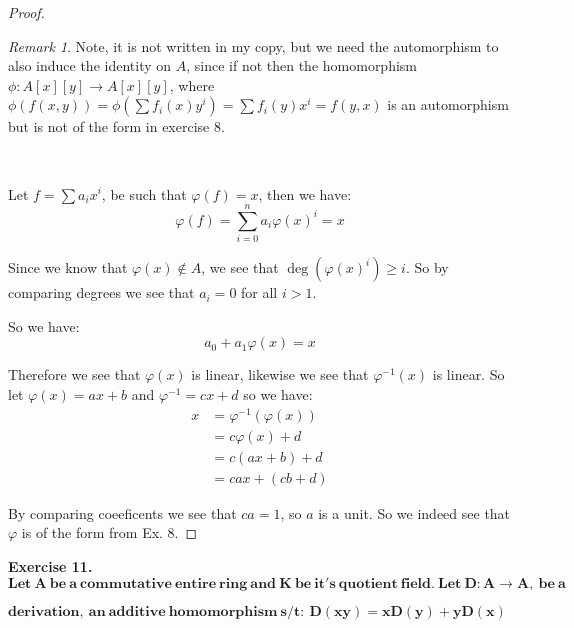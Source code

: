 \documentclass{article}
\theoremstyle{definition}
\theoremstyle{remark}
\newtheorem*{remark}{Remark}
\theoremstyle{definition}
\newcounter{exercise}[subsection]
\begin{document}
\begin{proof}
\begin{remark}
    Note, it is not written in my copy, but we need the automorphism to also induce the identity on $A$, since if not then the homomorphism $\phi\colon A[x][y] \rightarrow A[x][y]$, where $\phi(f(x,y)) = \phi(\sum f_i(x)y^i) = \sum f_i(y)x^i = f(y,x)$ is an automorphism but is not of the form in exercise 8.
\end{remark}

\

Let $f=\sum {a_i}x^i$, be such that $\varphi(f) = x$, then we have:\begin{equation}
    \varphi(f) = \sum_{i=0}^n{a_i}{\varphi(x)}^i = x
\end{equation}

Since we know that $\varphi(x)\not\in A$, we see that $\deg({\varphi(x)}^i)\geq i$. So by comparing degrees we see that $a_i=0$ for all $i>1$.

So we have:\begin{equation}
    a_0+a_1\varphi(x) = x
\end{equation}

Therefore we see that $\varphi(x)$ is linear, likewise we see that $\varphi^{-1}(x)$ is linear. So let $\varphi(x) = ax+b$ and $\varphi^{-1}=cx+d$ so we have:\begin{align}
    x &= \varphi^{-1}(\varphi(x))\\
    &= c\varphi(x)+d\\
    &= c(ax+b)+d\\
    &= cax+(cb+d)
\end{align} 

By comparing coeeficents we see that $ca = 1$, so $a$ is a unit. So we indeed see that $\varphi$ is of the form from Ex. 8. 
\end{proof}


\textbf{Exercise 11. }$\mathbf{Let\ A\ be \ a\ commutative\ entire\ ring\ and \ K\ be \ it's\ quotient\ field.\ Let\ D\colon A\rightarrow A, \ be \ a}$

$\mathbf{derivation, \ an \ additive\ homomorphism\ s/t: \ D(xy) = xD(y)+yD(x)}$
\end{document}
